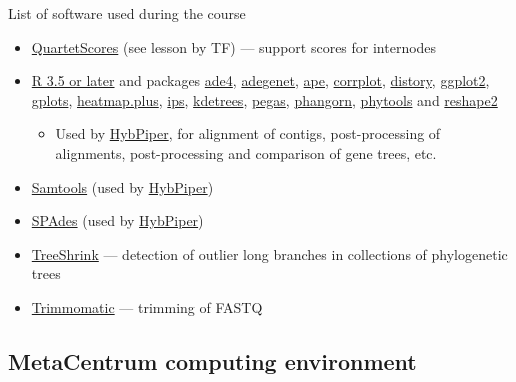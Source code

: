 \documentclass[compress, ucs, xelatex, 11pt, xcolor=x11names, aspectratio=1609,
	hyperref={
		bookmarks=true,
		unicode=true,
		colorlinks=true,
		pdftitle={HybSeq course},
		plainpages=false,
		pdfauthor={Vojtech Zeisek},
		pdfsubject={Practical processing of HybSeq target enrichment sequencing data on computing grids like MetaCentrum},
		pdfcreator={XeLaTeX},
		pdfkeywords={BASH, command line, GNU, HybSeq, Linux, MetaCentrum, sequencing shell, target enrichment},
		linkcolor=Cyan2, %
		anchorcolor=Firebrick2, %
		citecolor=Firebrick2, %
		filecolor=Firebrick2, %
		menucolor=Firebrick2, %
		urlcolor=Chartreuse2, %
		pdftex},
	url={hyphens, lowtilde} %
	]{beamer}
\begin{document}
\begin{frame}[allowframebreaks]{List of software used during the course}
\begin{itemize}
		\item \href{https://github.com/lutteropp/QuartetScores}{QuartetScores} (see lesson by TF) --- support scores for internodes
		\item \href{https://www.r-project.org/}{R 3.5 or later} and packages \href{https://cran.r-project.org/package=ade4}{ade4}, \href{https://cran.r-project.org/package=adegenet}{adegenet}, \href{https://cran.r-project.org/package=ape}{ape}, \href{https://cran.r-project.org/package=corrplot}{corrplot}, \href{https://cran.r-project.org/package=distory}{distory}, \href{https://cran.r-project.org/package=ggplot2}{ggplot2}, \href{https://cran.r-project.org/package=gplots}{gplots}, \href{https://cran.r-project.org/package=heatmap.plus}{heatmap.plus}, \href{https://cran.r-project.org/package=ips}{ips}, \href{https://cran.r-project.org/package=kdetrees}{kdetrees}, \href{https://cran.r-project.org/package=pegas}{pegas}, \href{https://cran.r-project.org/package=phangorn}{phangorn}, \href{https://cran.r-project.org/package=phytools}{phytools} and \href{https://cran.r-project.org/package=reshape2}{reshape2}
		\begin{itemize}
			\item Used by \href{https://github.com/mossmatters/HybPiper/wiki}{HybPiper}, for alignment of contigs, post-processing of alignments, post-processing and comparison of gene trees, etc.
		\end{itemize}
		\item \href{https://github.com/samtools/samtools}{Samtools} (used by \href{https://github.com/mossmatters/HybPiper/wiki}{HybPiper})
		\item \href{https://github.com/ablab/spades}{SPAdes} (used by \href{https://github.com/mossmatters/HybPiper/wiki}{HybPiper})
		\item \href{https://github.com/uym2/TreeShrink}{TreeShrink} --- detection of outlier long branches in collections of phylogenetic trees
		\item \href{http://www.usadellab.org/cms/?page=trimmomatic}{Trimmomatic} --- trimming of FASTQ
	\end{itemize}
\end{frame}

\subsection{MetaCentrum computing environment}
\end{document}
